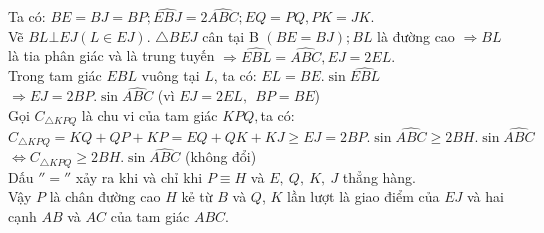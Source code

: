 \begin{ex}
{\begin{enumerate}
\begin{center}
\end{center}
Ta có: $BE=BJ=BP;\widehat{EBJ}=2\widehat{ABC};EQ=PQ,PK=JK.$\\
Vẽ $BL\bot EJ\left(L\in EJ\right)$. $\triangle BEJ$ cân tại B $\left(BE=BJ\right);BL$ là đường cao
$\Rightarrow BL$ là tia phân giác và là trung tuyến $\Rightarrow \widehat{EBL}=\widehat{ABC},EJ=2EL.$\\
Trong tam giác $EBL$ vuông tại $L$, ta có: $EL=BE.\sin \widehat{EBL}$
$\Rightarrow EJ=2BP.\sin \widehat{ABC}$ (vì $ EJ=2EL,\ \ BP=BE$)\\
Gọi ${C}_{\triangle KPQ}$ là chu vi của tam giác $KPQ,$ta có:\\
${C}_{\triangle KPQ}=KQ+QP+KP=EQ+QK+KJ\ge EJ=2BP.\sin \widehat{ABC}\ge 2BH.\sin \widehat{ABC}$\\
$\Leftrightarrow {C}_{\triangle KPQ}\ge 2BH.\sin \widehat{ABC}$ (không đổi)\\
Dấu $''=''$ xảy ra khi và chỉ khi $P\equiv H$ và $E,\ Q,\ K,\ J$ thẳng hàng.\\
Vậy $P$ là chân đường cao $H$ kẻ từ $B$ và $Q$, $K$ lần lượt là giao điểm của $EJ$ và hai cạnh $AB$ và $AC$ của tam giác $ABC$.
\end{enumerate}
}
\end{ex}
